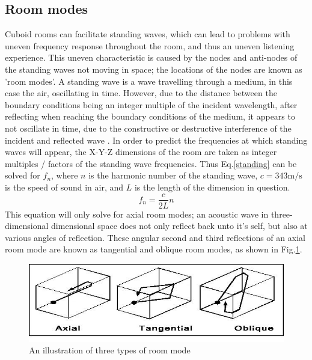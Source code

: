 \documentclass[10pt, twocolumn]{article}
\begin{document}
        \subsection{Room modes}
        Cuboid rooms can facilitate standing waves, which can lead to problems with uneven frequency response throughout the room, and thus an uneven listening experience.
        This uneven characteristic is caused by the nodes and anti-nodes of the standing waves not moving in space; the locations of the nodes are known as 'room modes'.
        A standing wave is a wave travelling through a medium, in this case the air, oscillating in time.
        However, due to the distance between the boundary conditions being an integer multiple of the incident wavelength, after reflecting when reaching the boundary conditions of the medium, it appears to not oscillate in time, due to the constructive or destructive interference of the incident and reflected wave \cite{PHYS15}.
        In order to predict the frequencies at which standing waves will appear, the X-Y-Z dimensions of the room are taken as integer multiples / factors of the standing wave frequencies.
        Thus Eq.\ref{standing} can be solved for $f_n$, where $n$ is the harmonic number of the standing wave, $c=343\si{\meter\per\second}$ is the speed of sound in air, and $L$ is the length of the dimension in question.
        \begin{equation}\label{standing}
            f_n = \frac{c}{2L}n
        \end{equation}
        This equation will only solve for axial room modes; an acoustic wave in three-dimensional dimensional space does not only reflect back unto it's self, but also at various angles of reflection.
        These angular second and third reflections of an axial room mode are known as tangential and oblique room modes, as shown in Fig.\ref{oblique}.
        \begin{figure}[H]
            \centering
            \includegraphics[scale=0.375]{resources/oblique.jpg}
            \caption{An illustration of three types of room mode \cite{MODES}}
            \label{oblique}
        \end{figure}
\end{document}
